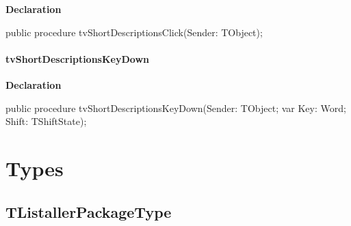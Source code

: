 \documentclass{report}
\newif\ifpdf
\begin{document}
\label{prjwizard.TfrmProjectWizard-tvShortDescriptionsClick}
\begin{list}{}{
\setlength{\itemindent}{0cm}
\setlength{\listparindent}{0cm}
\setlength{\leftmargin}{\evensidemargin}
\addtolength{\leftmargin}{\tmplength}
\settowidth{\labelsep}{X}
\addtolength{\leftmargin}{\labelsep}
\setlength{\labelwidth}{\tmplength}
}
\item[\textbf{Declaration}\hfill]
\ifpdf
\begin{flushleft}
\fi
\begin{ttfamily}
public procedure tvShortDescriptionsClick(Sender: TObject);\end{ttfamily}

\ifpdf
\end{flushleft}
\fi

\end{list}
\paragraph*{tvShortDescriptionsKeyDown}\hspace*{\fill}

\label{prjwizard.TfrmProjectWizard-tvShortDescriptionsKeyDown}
\begin{list}{}{
\setlength{\itemindent}{0cm}
\setlength{\listparindent}{0cm}
\setlength{\leftmargin}{\evensidemargin}
\addtolength{\leftmargin}{\tmplength}
\settowidth{\labelsep}{X}
\addtolength{\leftmargin}{\labelsep}
\setlength{\labelwidth}{\tmplength}
}
\item[\textbf{Declaration}\hfill]
\ifpdf
\begin{flushleft}
\fi
\begin{ttfamily}
public procedure tvShortDescriptionsKeyDown(Sender: TObject; var Key: Word; Shift: TShiftState);\end{ttfamily}

\ifpdf
\end{flushleft}
\fi

\end{list}
\section{Types}
\ifpdf
\subsection*{\large{\textbf{TListallerPackageType}}\normalsize\hspace{1ex}\hrulefill}
\else
\end{document}
